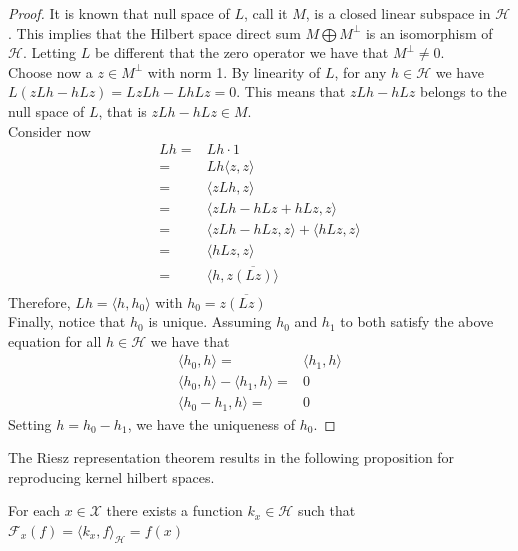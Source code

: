 \begin{proof}
    It is known that null space of $L$, call it $M$, is a closed linear subspace in $\mathcal{H}$. This implies that the Hilbert space direct sum $M \bigoplus M^\bot$ is an isomorphism of $\mathcal{H}$. Letting $L$ be different that the zero operator we have that $M^\bot \neq {0}$.
    \\
    Choose now a $z \in M^\bot$ with norm 1. By linearity of $L$, for any $h \in \mathcal{H}$ we have $L(zLh- hLz)=LzLh- LhLz=0$. This means that $zLh- hLz$ belongs to the null space of $L$, that is  $zLh- hLz \in M$. 
    \\
    Consider now 
    \begin{align}
        Lh=& Lh \cdot 1
        \\
        =& Lh \langle z,z\rangle
        \\
        =& \langle zLh, z\rangle \\
        =& \langle zLh -hLz+hLz, z\rangle
        \\
        =& \langle zLh -hLz, z\rangle +\langle hLz, z\rangle \\
        =& \langle hLz, z\rangle \\
        =& \langle h, z\overline{(Lz)}\rangle \\
    \end{align}
    Therefore, $Lh=\langle h, h_0\rangle$  with  $h_0=z\overline{(Lz)}$
    \\
    Finally, notice that $h_0$ is unique.
    Assuming $h_0$ and $h_1$ to both satisfy the above equation for all $h \in \mathcal{H}$ we have that
    \begin{align}
        \langle h_0,h \rangle=&\langle h_1, h \rangle \\
        \langle h_0,h \rangle-\langle h_1, h \rangle=& 0 \\
        \langle h_0 -h_1,h \rangle=& 0
    \end{align}
    Setting $h=h_0 -h_1$, we have the uniqueness of $h_0$.
    
\end{proof}


The Riesz representation theorem results in the following proposition for reproducing kernel hilbert spaces.
\begin{proposition}
For each $x \in \mathcal{X}$ there exists a function $k_{x} \in \mathcal{H}$ such that $\mathcal{F}_{x}(f)=\langle k_{x}, f\rangle_{\mathcal{H}}=f(x)$    
\end{proposition}

